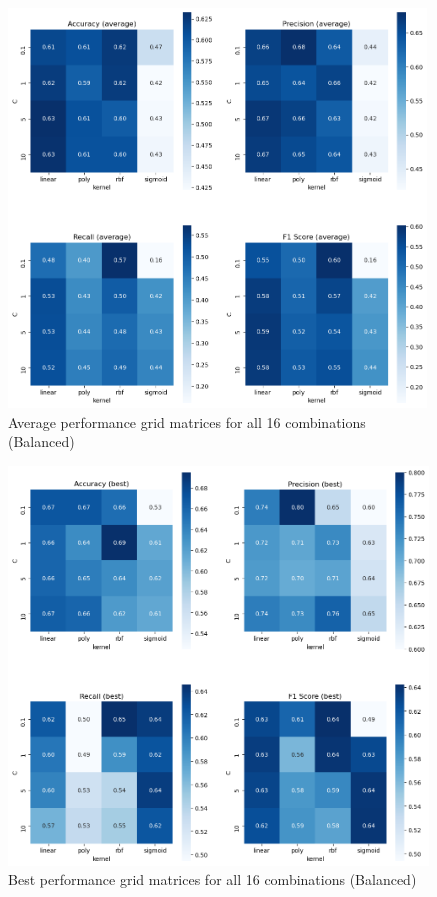 \documentclass{tron}
\begin{document}
\begin{figure}[H]
\centering
	\includegraphics[height=400px]{../src_code/output/p1/balance/Summary_balance_average}
	\caption{Average performance grid matrices for all 16 combinations (Balanced)}
	\label{table:balanced:performance-grid:avg}
\end{figure}

\begin{figure}[H]
\centering
	\includegraphics[height=400px]{../src_code/output/p1/balance/Summary_balance_best}
	\caption{Best performance grid matrices for all 16 combinations (Balanced)}
	\label{table:balanced:performance-grid:best}
\end{figure}
\end{document}
